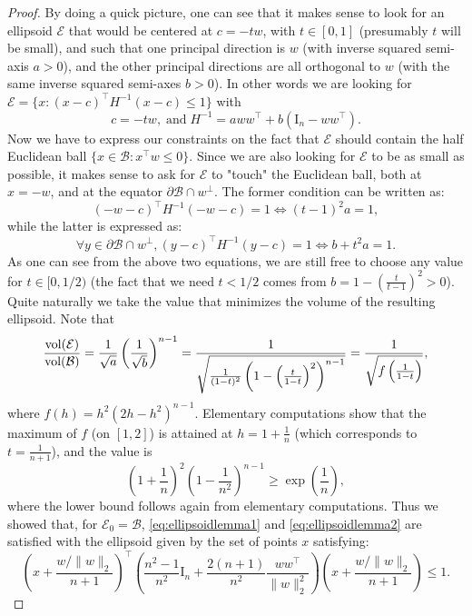 \documentclass[openany]{now}
\newcommand{\mI}{\mathrm{I}}
\newcommand{\cB}{\mathcal{B}}
\newcommand{\cE}{\mathcal{E}}
\begin{document}
\begin{proof}
By doing a quick picture, one can see that it makes sense to look for an ellipsoid $\mathcal{E}$ that would be centered at $c= - t w$, with $t \in [0,1]$ (presumably $t$ will be small), and such that one principal direction is $w$ (with inverse squared semi-axis $a>0$), and the other principal directions are all orthogonal to $w$ (with the same inverse squared semi-axes $b>0$). In other words we are looking for $\mathcal{E}= \{x: (x - c)^{\top} H^{-1} (x-c) \leq 1 \}$ with
$$c = - t w, \; \text{and} \; H^{-1} = a w w^{\top} + b (\mI_n - w w^{\top} ) .$$
Now we have to express our constraints on the fact that $\mathcal{E}$ should contain the half Euclidean ball $\{x \in \cB : x^{\top} w \leq 0\}$. Since we are also looking for $\mathcal{E}$ to be as small as possible, it makes sense to ask for $\mathcal{E}$ to "touch" the Euclidean ball, both at $x = - w$, and at the equator $\partial \cB \cap w^{\perp}$. The former condition can be written as:
$$(- w - c)^{\top} H^{-1} (- w - c) = 1 \Leftrightarrow (t-1)^2 a = 1 ,$$
while the latter is expressed as:
$$\forall y \in \partial \cB \cap w^{\perp}, (y - c)^{\top} H^{-1} (y - c) = 1 \Leftrightarrow b + t^2 a = 1 .$$
As one can see from the above two equations, we are still free to choose any value for $t \in [0,1/2)$ (the fact that we need $t<1/2$ comes from $b=1 - \left(\frac{t}{t-1}\right)^2>0$). Quite naturally we take the value that minimizes the volume of the resulting ellipsoid. Note that
$$\frac{\mathrm{vol}(\mathcal{E})}{\mathrm{vol}(\cB)} = \frac{1}{\sqrt{a}} \left(\frac{1}{\sqrt{b}}\right)^{n-1} 
= \frac{1}{\sqrt{\frac{1}{(1-t)^2}\left (1 - \left(\frac{t}{1-t}\right)^2\right)^{n-1}}} \\= \frac{1}{\sqrt{f\left(\frac{1}{1-t}\right)}} ,$$
where $f(h) = h^2 (2 h - h^2)^{n-1}$. Elementary computations show that the maximum of $f$ (on $[1,2]$) is attained at $h = 1+ \frac{1}{n}$ (which corresponds to $t=\frac{1}{n+1}$), and the value is 
$$\left(1+\frac{1}{n}\right)^2 \left(1 - \frac{1}{n^2} \right)^{n-1} \geq \exp \left(\frac{1}{n} \right),$$
where the lower bound follows again from elementary computations. Thus we showed that, for $\cE_0 = \cB$, \eqref{eq:ellipsoidlemma1} and \eqref{eq:ellipsoidlemma2} are satisfied with the ellipsoid given by the set of points $x$ satisfying:
\begin{equation} \label{eq:ellipsoidlemma5}
\left(x + \frac{w/\|w\|_2}{n+1}\right)^{\top} \left(\frac{n^2-1}{n^2} \mI_n + \frac{2(n+1)}{n^2} \frac{w w^{\top}}{\|w\|_2^2} \right) \left(x + \frac{w/\|w\|_2}{n+1} \right) \leq 1 .
\end{equation}



\end{proof}
\end{document}
